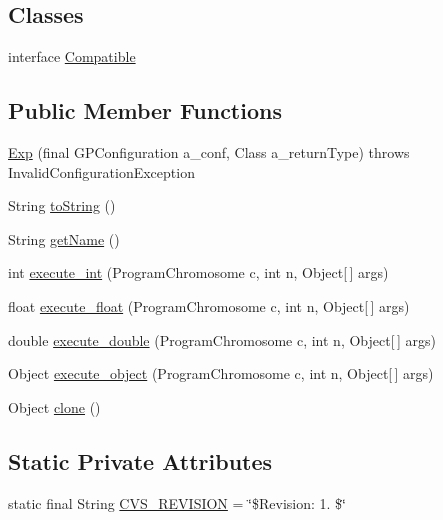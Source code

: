 \subsection*{Classes}
\begin{DoxyCompactItemize}
\item 
interface \hyperlink{interfaceorg_1_1jgap_1_1gp_1_1function_1_1_exp_1_1_compatible}{Compatible}
\end{DoxyCompactItemize}
\subsection*{Public Member Functions}
\begin{DoxyCompactItemize}
\item 
\hyperlink{classorg_1_1jgap_1_1gp_1_1function_1_1_exp_a53b0f7c8e39ff0e705490a7c3288aaf2}{Exp} (final G\-P\-Configuration a\-\_\-conf, Class a\-\_\-return\-Type)  throws Invalid\-Configuration\-Exception 
\item 
String \hyperlink{classorg_1_1jgap_1_1gp_1_1function_1_1_exp_aec02479d68143d8e06f198da2fd08406}{to\-String} ()
\item 
String \hyperlink{classorg_1_1jgap_1_1gp_1_1function_1_1_exp_ab0ebd432909164b47973647d5d96009b}{get\-Name} ()
\item 
int \hyperlink{classorg_1_1jgap_1_1gp_1_1function_1_1_exp_ad89e74665024c175bc18b676afe36dec}{execute\-\_\-int} (Program\-Chromosome c, int n, Object\mbox{[}$\,$\mbox{]} args)
\item 
float \hyperlink{classorg_1_1jgap_1_1gp_1_1function_1_1_exp_a87a759770f6d724f403760abf5e24246}{execute\-\_\-float} (Program\-Chromosome c, int n, Object\mbox{[}$\,$\mbox{]} args)
\item 
double \hyperlink{classorg_1_1jgap_1_1gp_1_1function_1_1_exp_aff450b103122938acf93d498c68fd40d}{execute\-\_\-double} (Program\-Chromosome c, int n, Object\mbox{[}$\,$\mbox{]} args)
\item 
Object \hyperlink{classorg_1_1jgap_1_1gp_1_1function_1_1_exp_a725effa8fef4ea68ca3f89e04e5442b6}{execute\-\_\-object} (Program\-Chromosome c, int n, Object\mbox{[}$\,$\mbox{]} args)
\item 
Object \hyperlink{classorg_1_1jgap_1_1gp_1_1function_1_1_exp_ad3fa0d849175a7286df3528b0213dfdf}{clone} ()
\end{DoxyCompactItemize}
\subsection*{Static Private Attributes}
\begin{DoxyCompactItemize}
\item 
static final String \hyperlink{classorg_1_1jgap_1_1gp_1_1function_1_1_exp_a1b86feb19be9dc6a3b59e509bedaf86b}{C\-V\-S\-\_\-\-R\-E\-V\-I\-S\-I\-O\-N} = \char`\"{}\$Revision\-: 1. \$\char`\"{}
\end{DoxyCompactItemize}
